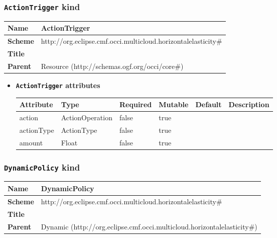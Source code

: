 \subsubsection{\texttt{ActionTrigger} kind}
\begin{center}
\begin{tabular}{|l|l|}
  \hline
  \textbf{Name} & ActionTrigger \\
  \hline  
  \textbf{Scheme} & http://org.eclipse.cmf.occi.multicloud.horizontalelasticity\# \\
  \hline
  \textbf{Title} &  \\
  \hline
  \textbf{Parent} & Resource (http://schemas.ogf.org/occi/core\#) \\
  \hline
\end{tabular}
\end{center}
\begin{itemize}
\item \textbf{\texttt{ActionTrigger} attributes}

\begin{tabularx}{\textwidth}{|l|l|p{1.4cm}|p{1.3cm}|l|X|}
  \hline
  \textbf{Attribute} & \textbf{Type} & \textbf{Required} & \textbf{Mutable} & \textbf{Default} & \textbf{Description} \\
  \hline  
  action & ActionOperation & false & true &  &  \\
  \hline
  actionType & ActionType & false & true &  &  \\
  \hline
  amount & Float & false & true &  &  \\
  \hline
\end{tabularx}
\end{itemize}



\subsubsection{\texttt{DynamicPolicy} kind}
\begin{center}
\begin{tabular}{|l|l|}
  \hline
  \textbf{Name} & DynamicPolicy \\
  \hline  
  \textbf{Scheme} & http://org.eclipse.cmf.occi.multicloud.horizontalelasticity\# \\
  \hline
  \textbf{Title} &  \\
  \hline
  \textbf{Parent} & Dynamic (http://org.eclipse.cmf.occi.multicloud.horizontalelasticity\#) \\
  \hline
\end{tabular}
\end{center}



